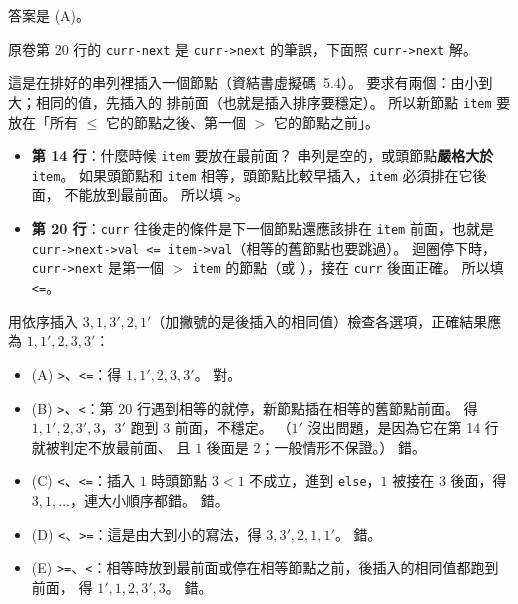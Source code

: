 \begin{pastsoln}
答案是 (A)。

原卷第 20 行的 \texttt{curr-next} 是 \texttt{curr->next} 的筆誤，下面照 \texttt{curr->next} 解。

這是在排好的串列裡插入一個節點（資結書虛擬碼~5.4）。 要求有兩個：由小到大；相同的值，先插入的
排前面（也就是插入排序要穩定）。 所以新節點 \texttt{item} 要放在「所有 $\le$ 它的節點之後、第一個
$>$ 它的節點之前」。
\begin{itemize}
\item \textbf{第 14 行}：什麼時候 \texttt{item} 要放在最前面？ 串列是空的，或頭節點\textbf{嚴格大於}
\texttt{item}。 如果頭節點和 \texttt{item} 相等，頭節點比較早插入，\texttt{item} 必須排在它後面，
不能放到最前面。 所以填 \texttt{>}。
\item \textbf{第 20 行}：\texttt{curr} 往後走的條件是下一個節點還應該排在 \texttt{item} 前面，也就是
\texttt{curr->next->val <= item->val}（相等的舊節點也要跳過）。 迴圈停下時，\texttt{curr->next}
是第一個 $>$ \texttt{item} 的節點（或 \NIL），接在 \texttt{curr} 後面正確。 所以填 \texttt{<=}。
\end{itemize}

用依序插入 $3, 1, 3', 2, 1'$（加撇號的是後插入的相同值）檢查各選項，正確結果應為
$1, 1', 2, 3, 3'$：
\begin{itemize}
\item (A) \texttt{>}、\texttt{<=}：得 $1, 1', 2, 3, 3'$。 對。
\item (B) \texttt{>}、\texttt{<}：第 20 行遇到相等的就停，新節點插在相等的舊節點前面。 得
$1, 1', 2, 3', 3$，$3'$ 跑到 $3$ 前面，不穩定。 （$1'$ 沒出問題，是因為它在第 14 行就被判定不放最前面、
且 $1$ 後面是 $2$；一般情形不保證。） 錯。
\item (C) \texttt{<}、\texttt{<=}：插入 $1$ 時頭節點 $3 < 1$ 不成立，進到 \texttt{else}，$1$ 被接在
$3$ 後面，得 $3, 1, \ldots$，連大小順序都錯。 錯。
\item (D) \texttt{<}、\texttt{>=}：這是由大到小的寫法，得 $3, 3', 2, 1, 1'$。 錯。
\item (E) \texttt{>=}、\texttt{<}：相等時放到最前面或停在相等節點之前，後插入的相同值都跑到前面，
得 $1', 1, 2, 3', 3$。 錯。
\end{itemize}
\end{pastsoln}
